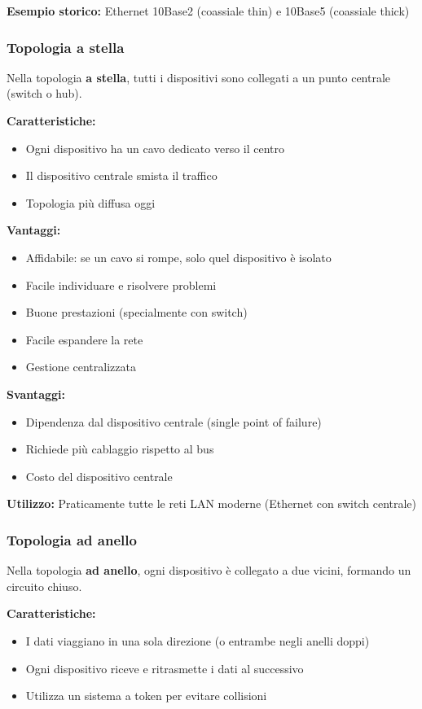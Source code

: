 \documentclass[12pt,a4paper]{article}
\begin{document}
\textbf{Esempio storico:} Ethernet 10Base2 (coassiale thin) e 10Base5 (coassiale thick)

\subsubsection{Topologia a stella}

Nella topologia \textbf{a stella}, tutti i dispositivi sono collegati a un punto centrale (switch o hub).

\textbf{Caratteristiche:}
\begin{itemize}
    \item Ogni dispositivo ha un cavo dedicato verso il centro
    \item Il dispositivo centrale smista il traffico
    \item Topologia più diffusa oggi
\end{itemize}

\textbf{Vantaggi:}
\begin{itemize}
    \item Affidabile: se un cavo si rompe, solo quel dispositivo è isolato
    \item Facile individuare e risolvere problemi
    \item Buone prestazioni (specialmente con switch)
    \item Facile espandere la rete
    \item Gestione centralizzata
\end{itemize}

\textbf{Svantaggi:}
\begin{itemize}
    \item Dipendenza dal dispositivo centrale (single point of failure)
    \item Richiede più cablaggio rispetto al bus
    \item Costo del dispositivo centrale
\end{itemize}

\textbf{Utilizzo:} Praticamente tutte le reti LAN moderne (Ethernet con switch centrale)

\subsubsection{Topologia ad anello}

Nella topologia \textbf{ad anello}, ogni dispositivo è collegato a due vicini, formando un circuito chiuso.

\textbf{Caratteristiche:}
\begin{itemize}
    \item I dati viaggiano in una sola direzione (o entrambe negli anelli doppi)
    \item Ogni dispositivo riceve e ritrasmette i dati al successivo
    \item Utilizza un sistema a token per evitare collisioni
\end{itemize}
\end{document}
